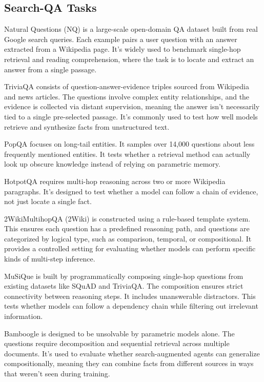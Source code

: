\documentclass[11pt]{article}
\begin{document}
\subsection{Search-QA Tasks}
Natural Questions (NQ) is a large-scale open-domain QA dataset built from real Google search queries. Each example pairs a user question with an answer extracted from a Wikipedia page. It’s widely used to benchmark single-hop retrieval and reading comprehension, where the task is to locate and extract an answer from a single passage.

TriviaQA consists of question-answer-evidence triples sourced from Wikipedia and news articles. The questions involve complex entity relationships, and the evidence is collected via distant supervision, meaning the answer isn’t necessarily tied to a single pre-selected passage. It’s commonly used to test how well models retrieve and synthesize facts from unstructured text.

PopQA focuses on long-tail entities. It samples over 14,000 questions about less frequently mentioned entities. It tests whether a retrieval method can actually look up obscure knowledge instead of relying on parametric memory.

HotpotQA requires multi-hop reasoning across two or more Wikipedia paragraphs. It’s designed to test whether a model can follow a chain of evidence, not just locate a single fact.

2WikiMultihopQA (2Wiki) is constructed using a rule-based template system. This ensures each question has a predefined reasoning path, and questions are categorized by logical type, such as comparison, temporal, or compositional. It provides a controlled setting for evaluating whether models can perform specific kinds of multi-step inference.

MuSiQue is built by programmatically composing single-hop questions from existing datasets like SQuAD and TriviaQA. The composition ensures strict connectivity between reasoning steps. It includes unanswerable distractors. This tests whether models can follow a dependency chain while filtering out irrelevant information.

Bamboogle is designed to be unsolvable by parametric models alone. The questions require decomposition and sequential retrieval across multiple documents. It’s used to evaluate whether search-augmented agents can generalize compositionally, meaning they can combine facts from different sources in ways that weren’t seen during training.
\end{document}
